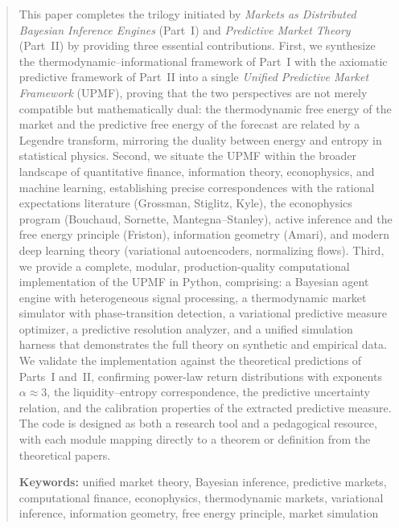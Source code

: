 \documentclass[12pt,a4paper]{article}
\theoremstyle{definition}
\begin{document}
\begin{abstract}
\noindent This paper completes the trilogy initiated by \emph{Markets as Distributed Bayesian Inference Engines} (Part~I) and \emph{Predictive Market Theory} (Part~II) by providing three essential contributions. First, we synthesize the thermodynamic--informational framework of Part~I with the axiomatic predictive framework of Part~II into a single \emph{Unified Predictive Market Framework} (UPMF), proving that the two perspectives are not merely compatible but mathematically dual: the thermodynamic free energy of the market and the predictive free energy of the forecast are related by a Legendre transform, mirroring the duality between energy and entropy in statistical physics. Second, we situate the UPMF within the broader landscape of quantitative finance, information theory, econophysics, and machine learning, establishing precise correspondences with the rational expectations literature (Grossman, Stiglitz, Kyle), the econophysics program (Bouchaud, Sornette, Mantegna--Stanley), active inference and the free energy principle (Friston), information geometry (Amari), and modern deep learning theory (variational autoencoders, normalizing flows). Third, we provide a complete, modular, production-quality computational implementation of the UPMF in Python, comprising: a Bayesian agent engine with heterogeneous signal processing, a thermodynamic market simulator with phase-transition detection, a variational predictive measure optimizer, a predictive resolution analyzer, and a unified simulation harness that demonstrates the full theory on synthetic and empirical data. We validate the implementation against the theoretical predictions of Parts~I and~II, confirming power-law return distributions with exponents $\alpha \approx 3$, the liquidity--entropy correspondence, the predictive uncertainty relation, and the calibration properties of the extracted predictive measure. The code is designed as both a research tool and a pedagogical resource, with each module mapping directly to a theorem or definition from the theoretical papers.

\medskip
\noindent\textbf{Keywords:} unified market theory, Bayesian inference, predictive markets, computational finance, econophysics, thermodynamic markets, variational inference, information geometry, free energy principle, market simulation
\end{abstract}

\newpage
\tableofcontents
\newpage
\end{document}
